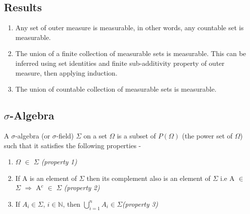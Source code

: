 \documentclass{article}
\begin{document}
\subsection{Results}
\begin{enumerate}
    \item Any set of outer measure is measurable, in other words, any countable set is measurable.
    \item The union of a finite collection of measurable sets is measurable. This can be inferred using set identities and finite sub-additivity property of outer measure, then applying induction.
    \item The union of countable collection of measurable sets is measurable.
\end{enumerate}

\subsection{$\sigma$-Algebra}
A $\sigma$-algebra (or $\sigma$-field) $\Sigma$ on a set $\Omega$ is a subset of $P(\Omega)$ (the power set of $\Omega$) such that it satisfies the following properties -


\begin{enumerate}
	\item $\Omega$ $\in$ $\Sigma$ \textit{(property 1)}
	\item If A is an element of $\Sigma$ then its complement also is an element of $\Sigma$ i.e A $\in$ $\Sigma$ $\Rightarrow$ A$^c$ $\in$ $\Sigma$ \textit{(\textit{property 2})}
	\item If $A_i \in \Sigma$, 
	$i\in \mathbb{N}$, then $\bigcup\limits_{i=1}^{n}A_i \in \Sigma$\textit{(\textit{property 3})}
\end{enumerate}
\end{document}
